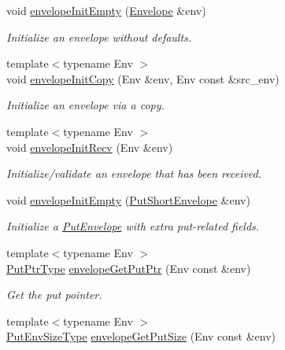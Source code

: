 \begin{DoxyCompactItemize}
void \hyperlink{namespacevt_a2594d3d4a1f40c4db73713a8b62b24df}{envelope\+Init\+Empty} (\hyperlink{namespacevt_aa9c8cc094b5361482021d63012987814}{Envelope} \&env)
\begin{DoxyCompactList}\small\item\em Initialize an envelope without defaults. \end{DoxyCompactList}\item 
{\footnotesize template$<$typename Env $>$ }\\void \hyperlink{namespacevt_a931b61a10a85d44d2355e984e40177ff}{envelope\+Init\+Copy} (Env \&env, Env const \&src\+\_\+env)
\begin{DoxyCompactList}\small\item\em Initialize an envelope via a copy. \end{DoxyCompactList}\item 
{\footnotesize template$<$typename Env $>$ }\\void \hyperlink{namespacevt_ace3e4542ae09ecd9728bea6548d71d5a}{envelope\+Init\+Recv} (Env \&env)
\begin{DoxyCompactList}\small\item\em Initialize/validate an envelope that has been received. \end{DoxyCompactList}\item 
void \hyperlink{namespacevt_ab507eac4b5cf7e2712f2c626b379498e}{envelope\+Init\+Empty} (\hyperlink{namespacevt_a8d7a7de9e76bfea1600009a775b7298c}{Put\+Short\+Envelope} \&env)
\begin{DoxyCompactList}\small\item\em Initialize a {\ttfamily \hyperlink{structvt_1_1_put_envelope}{Put\+Envelope}} with extra put-\/related fields. \end{DoxyCompactList}\item 
{\footnotesize template$<$typename Env $>$ }\\\hyperlink{namespacevt_a537693bfe0223c71eb52bdbd6ea2c741}{Put\+Ptr\+Type} \hyperlink{namespacevt_a56ab014300930ba8ffc902793035eca2}{envelope\+Get\+Put\+Ptr} (Env const \&env)
\begin{DoxyCompactList}\small\item\em Get the put pointer. \end{DoxyCompactList}\item 
{\footnotesize template$<$typename Env $>$ }\\\hyperlink{namespacevt_aa241444e21c15238e185923792814fe4}{Put\+Env\+Size\+Type} \hyperlink{namespacevt_abbd3e4684f30ad052e43a1655f540b6f}{envelope\+Get\+Put\+Size} (Env const \&env)

\end{DoxyCompactItemize}
